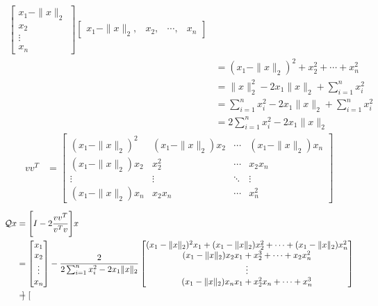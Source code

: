\documentclass{article}
\newcommand{\twonorm}[1]{\| #1 \|_2}
\begin{document}
\begin{enumerate}
{\begin{align*}
\begin{bmatrix}
    x_1 - \twonorm{x} \\
    x_2 \\
    \vdots \\
    x_n
  \end{bmatrix}
  \begin{bmatrix}
    x_1 - \twonorm{x}, &
    x_2, &
    \cdots, &
    x_n
  \end{bmatrix} \\
 & =  (x_1 - \twonorm{x})^2 + x_2^2 + \cdots + x_n^2 \\
 & = \twonorm{x}^2 - 2x_1\twonorm{x} + \sum_{i=1}^{n}x_i^2 \\
 & = \sum_{i=1}^{n}x_i^2 - 2x_1\twonorm{x} + \sum_{i=1}^{n}x_i^2 \\
 & =  2\sum_{i=1}^{n}x_i^2 - 2x_1\twonorm{x}
  \end{align*}
  \begin{align*}
     vv^T &= 
    \begin{bmatrix}
        (x_1 - \twonorm{x})^2 & (x_1 - \twonorm{x})x_2 & \cdots & (x_1 - \twonorm{x})x_n \\
        (x_1 - \twonorm{x})x_2 & x_2^2 & \cdots & x_2x_n \\
        \vdots  & \vdots  & \ddots & \vdots  \\
        (x_1 - \twonorm{x})x_n & x_2x_n & \cdots & x_n^2 
    \end{bmatrix}
  \end{align*}
  \begin{align*}
      \calQ x &= \Bigg[I - 2 \frac{vv^T}{v^Tv} \Bigg] x \\
      &= 
      \begin{bmatrix}
        x_1 \\
        x_2 \\
        \vdots \\
        x_n
      \end{bmatrix}
     - \frac{2}{2\sum_{i=1}^{n}x_i^2 - 2x_1\twonorm{x}}
     \begin{bmatrix}
        (x_1 - \twonorm{x})^2x_1 + (x_1 - \twonorm{x})x_2^2 + \cdots + (x_1 - \twonorm{x})x_n^2 \\
        (x_1 - \twonorm{x})x_2x_1 + x_2^3 + \cdots + x_2x_n^2 \\
        \vdots \\
        (x_1 - \twonorm{x})x_nx_1 + x_2^2x_n + \cdots + x_n^3 
    \end{bmatrix} \\
      &= 
      \begin{bmatrix}

\end{bmatrix}
\end{align*}}
\end{enumerate}
\end{document}
